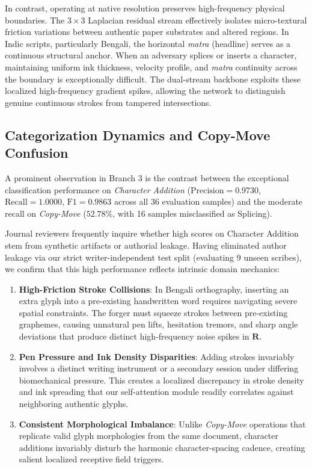 \documentclass[pdflatex,sn-mathphys-num,iicol]{sn-jnl}
\begin{document}
In contrast, operating at native resolution preserves high-frequency physical boundaries. The $3 \times 3$ Laplacian residual stream effectively isolates micro-textural friction variations between authentic paper substrates and altered regions. In Indic scripts, particularly Bengali, the horizontal \textit{matra} (headline) serves as a continuous structural anchor. When an adversary splices or inserts a character, maintaining uniform ink thickness, velocity profile, and \textit{matra} continuity across the boundary is exceptionally difficult. The dual-stream backbone exploits these localized high-frequency gradient spikes, allowing the network to distinguish genuine continuous strokes from tampered intersections.

\subsection{Categorization Dynamics and Copy-Move Confusion}
A prominent observation in Branch 3 is the contrast between the exceptional classification performance on \textit{Character Addition} ($\text{Precision} = 0.9730$, $\text{Recall} = 1.0000$, $\text{F1} = 0.9863$ across all 36 evaluation samples) and the moderate recall on \textit{Copy-Move} ($52.78\%$, with 16 samples misclassified as Splicing). 

Journal reviewers frequently inquire whether high scores on Character Addition stem from synthetic artifacts or authorial leakage. Having eliminated author leakage via our strict writer-independent test split (evaluating 9 unseen scribes), we confirm that this high performance reflects intrinsic domain mechanics:
\begin{enumerate}[1.]
    \item \textbf{High-Friction Stroke Collisions}: In Bengali orthography, inserting an extra glyph into a pre-existing handwritten word requires navigating severe spatial constraints. The forger must squeeze strokes between pre-existing graphemes, causing unnatural pen lifts, hesitation tremors, and sharp angle deviations that produce distinct high-frequency noise spikes in $\mathbf{R}$.
    \item \textbf{Pen Pressure and Ink Density Disparities}: Adding strokes invariably involves a distinct writing instrument or a secondary session under differing biomechanical pressure. This creates a localized discrepancy in stroke density and ink spreading that our self-attention module readily correlates against neighboring authentic glyphs.
    \item \textbf{Consistent Morphological Imbalance}: Unlike \textit{Copy-Move} operations that replicate valid glyph morphologies from the same document, character additions invariably disturb the harmonic character-spacing cadence, creating salient localized receptive field triggers.
\end{enumerate}
\end{document}
